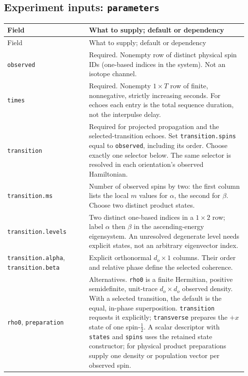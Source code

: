 \documentclass[11pt,a4paper]{article}
\newcommand{\code}[1]{\texttt{#1}}
\begin{document}
\subsection{Experiment inputs: \code{parameters}}
\begingroup\small
\begin{longtable}{@{}>{\raggedright\arraybackslash}p{0.335\linewidth}@{\hspace{0.025\linewidth}}>{\raggedright\arraybackslash}p{0.64\linewidth}@{}}
\toprule
Field & What to supply; default or dependency\\
\midrule\endfirsthead
\toprule
Field & What to supply; default or dependency\\
\midrule\endhead
\midrule\endfoot
\bottomrule\endlastfoot
\code{observed} & Required. Nonempty row of distinct physical spin IDs (one-based indices in the system). Not an isotope channel.\\
\code{times} & Required. Nonempty $1\times T$ row of finite, nonnegative, strictly increasing seconds. For echoes each entry is the total sequence duration, not the interpulse delay.\\
\code{transition} & Required for projected propagation and the selected-transition echoes. Set \code{transition.spins} equal to \code{observed}, including its order. Choose exactly one selector below. The same selector is resolved in each orientation's observed Hamiltonian.\\
\code{transition.ms} & Number of observed spins by two: the first column lists the local $m$ values for $\alpha$, the second for $\beta$. Choose two distinct product states.\\
\code{transition.levels} & Two distinct one-based indices in a $1\times2$ row; label $\alpha$ then $\beta$ in the ascending-energy eigensystem. An unresolved degenerate level needs explicit states, not an arbitrary eigenvector index.\\
\code{transition.alpha}, \code{transition.beta} & Explicit orthonormal $d_o\times1$ columns. Their order and relative phase define the selected coherence.\\
\code{rho0}, \code{preparation} & Alternatives. \code{rho0} is a finite Hermitian, positive semidefinite, unit-trace $d_o\times d_o$ observed density. With a selected transition, the default is the equal, in-phase superposition. \code{transition} requests it explicitly; \code{transverse} prepares the $+x$ state of one spin-$\tfrac12$. A scalar descriptor with \code{states} and \code{spins} uses the retained state constructor; for physical product preparations supply one density or population vector per observed spin.\\

\end{longtable}
\end{document}
